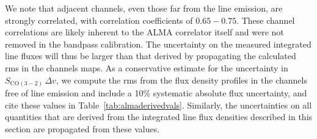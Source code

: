 \documentclass[a4paper,fleqn,usenatbib]{mnras}
\begin{document}
We note that adjacent channels, even those far from the line emission, are strongly correlated, with correlation coefficients of $0.65-0.75$. These channel correlations are likely inherent to the ALMA correlator itself and were not removed in the bandpass calibration. The uncertainty on the measured integrated line fluxes will thus be larger than that derived by propagating the calculated rms in the channels maps. As a conservative estimate for the uncertainty in $S_{\mathrm{CO(3-2)}}\,\Delta v$, we compute the rms from the flux density profiles in the channels free of line emission and include a 10\% systematic absolute flux uncertainty, and cite these values in Table~\ref{tab:almaderivedvals}. Similarly, the uncertainties on all quantities that are derived from the integrated line flux densities described in this section are propagated from these values.

\end{document}
